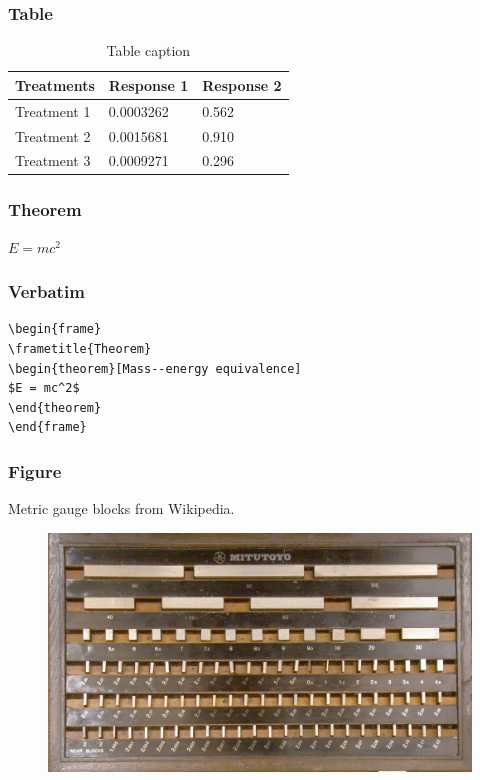 \documentclass{beamer}
\begin{document}
\begin{frame}
\frametitle{Table}
\begin{table}
\begin{tabular}{l l l}
\toprule
\textbf{Treatments} & \textbf{Response 1} & \textbf{Response 2}\\
\midrule
Treatment 1 & 0.0003262 & 0.562 \\
Treatment 2 & 0.0015681 & 0.910 \\
Treatment 3 & 0.0009271 & 0.296 \\
\bottomrule
\end{tabular}
\caption{Table caption}
\end{table}
\end{frame}


\begin{frame}
\frametitle{Theorem}
\begin{theorem}
$E = mc^2$
\end{theorem}
\end{frame}


\begin{frame}[fragile] %
\frametitle{Verbatim}
\begin{example}
\begin{verbatim}
\begin{frame}
\frametitle{Theorem}
\begin{theorem}[Mass--energy equivalence]
$E = mc^2$
\end{theorem}
\end{frame}\end{verbatim}
\end{example}
\end{frame}


\begin{frame}
\frametitle{Figure}
Metric gauge blocks from Wikipedia.
\begin{figure}
\includegraphics[width=0.8\linewidth]{GaugeBlockMetricSet.jpg}
\end{figure}
\end{frame}
\end{document}
